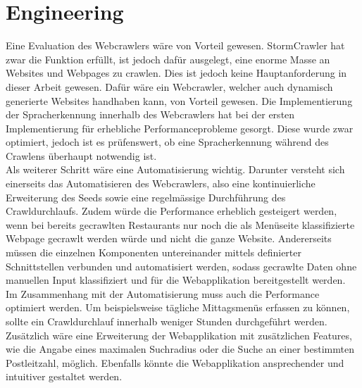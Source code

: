 \section{Engineering}
Eine Evaluation des Webcrawlers wäre von Vorteil gewesen.
StormCrawler hat zwar die Funktion erfüllt, ist jedoch dafür ausgelegt, eine enorme Masse an Websites und Webpages zu crawlen.
Dies ist jedoch keine Hauptanforderung in dieser Arbeit gewesen.
Dafür wäre ein Webcrawler, welcher auch dynamisch generierte Websites handhaben kann, von Vorteil gewesen.
Die Implementierung der Spracherkennung innerhalb des Webcrawlers hat bei der ersten Implementierung für erhebliche Performanceprobleme gesorgt.
Diese wurde zwar optimiert, jedoch ist es prüfenswert, ob eine Spracherkennung während des Crawlens überhaupt notwendig ist.\\
Als weiterer Schritt wäre eine Automatisierung wichtig.
Darunter versteht sich einerseits das Automatisieren des Webcrawlers, also eine kontinuierliche Erweiterung des Seeds sowie eine regelmässige Durchführung des Crawldurchlaufs.
Zudem würde die Performance erheblich gesteigert werden, wenn bei bereits gecrawlten Restaurants nur noch die als Menüseite klassifizierte Webpage gecrawlt werden würde und nicht die ganze Website.
Andererseits müssen die einzelnen Komponenten untereinander mittels definierter Schnittstellen verbunden und automatisiert werden, sodass gecrawlte Daten ohne manuellen Input klassifiziert und für die Webapplikation bereitgestellt werden.\\
Im Zusammenhang mit der Automatisierung muss auch die Performance optimiert werden.
Um beispielsweise tägliche Mittagsmenüs erfassen zu können, sollte ein Crawldurchlauf innerhalb weniger Stunden durchgeführt werden.\\
Zusätzlich wäre eine Erweiterung der Webapplikation mit zusätzlichen Features, wie die Angabe eines maximalen Suchradius oder die Suche an einer bestimmten Postleitzahl, möglich.
Ebenfalls könnte die Webapplikation ansprechender und intuitiver gestaltet werden.


